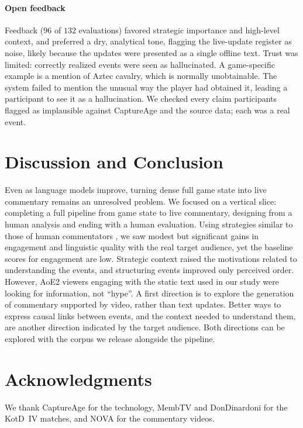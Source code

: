 \documentclass[11pt]{article}
\begin{document}
\paragraph{Open feedback}
Feedback ($96$ of $132$ evaluations) favored strategic importance and high-level context, and preferred a dry, analytical tone, flagging the live-update register as noise, likely because the updates were presented as a single offline text. Trust was limited: correctly realized events were seen as hallucinated. A game-specific example is a mention of Aztec cavalry, which is normally unobtainable. The system failed to mention the unusual way the player had obtained it, leading a participant to see it as a hallucination. We checked every claim participants flagged as implausible against CaptureAge and the source data; each was a real event.

\section{Discussion and Conclusion}
Even as language models improve, turning dense full game state into live commentary remains an unresolved problem. We focused on a vertical slice: completing a full pipeline from game state to live commentary, designing from a human analysis and ending with a human evaluation. Using strategies similar to those of human commentators \citep{dodge2018,penney2021}, we saw modest but significant gains in engagement and linguistic quality with the real target audience, yet the baseline scores for engagement are low. Strategic context raised the motivations related to understanding the events, and structuring events improved only perceived order. However, AoE2 viewers engaging with the static text used in our study were looking for information, not ``hype''. A first direction is to explore the generation of commentary supported by video, rather than text updates. Better ways to express causal links between events, and the context needed to understand them, are another direction indicated by the target audience. Both directions can be explored with the corpus we release alongside the pipeline.

\section*{Acknowledgments}
We thank CaptureAge for the technology, MembTV and DonDinardoni for the KotD~IV matches, and NOVA for the commentary videos.
\end{document}
